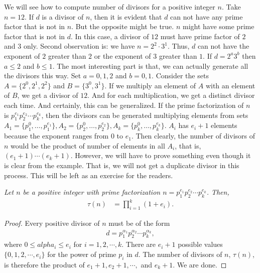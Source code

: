 \documentclass[12pt]{subfile}
\begin{document}
		We will see how to compute number of divisors for a positive integer $n$. Take $n=12$. If $d$ is a divisor of $n$, then it is evident that $d$ can not have any prime factor that is not in $n$. But the opposite might be true. $n$ might have some prime factor that is not in $d$. In this case, a divisor of $12$ must have prime factor of $2$ and $3$ only. Second observation is: we have $n=2^2\cdot3^1$. Thus, $d$ can not have the exponent of $2$ greater than $2$ or the exponent of $3$ greater than $1$. If $d=2^a3^b$ then $a\leq2$ and $b\leq1$. The most interesting part is that, we can actually generate all the divisors this way. Set $a=0,1,2$ and $b=0,1$. Consider the sets $A=\{2^0,2^1,2^2\}$ and $B=\{3^0,3^1\}$. If we multiply an element of $A$ with an element of $B$, we get a divisor of $12$. And for each multiplication, we get a distinct divisor each time. And certainly, this can be generalized. If the prime factorization of $n$ is $p_1^{e_1}p_2^{e_2}\cdots p_k^{e_k}$, then the divisors can be generated multiplying elements from sets $A_1=\{p_1^0,\ldots,p_1^{e_1}\},A_2=\{p_2^{0},\ldots,p_2^{e_2}\},A_k=\{p_k^0,\ldots,p_k^{e_k} \}$. $A_i$ has $e_i+1$ elements because the exponent ranges from $0$ to $e_1$. Then clearly, the number of divisors of $n$ would be the product of number of elements in all $A_i$, that is, $(e_1+1)\cdots(e_k+1)$. However, we will have to prove something even though it is clear from the example. That is, we will not get a duplicate divisor in this process. This will be left as an exercise for the readers.
			\begin{theorem}\slshape
				Let $n$ be a positive integer with prime factorization $n=p_1^{e_1}p_2^{e_2}\cdots p_k^{e_k}$. Then,
				\begin{align}
				\tau(n) &= \prod_{i=1}^{k} (1+e_i). \label{eq:dformula-eq1}
				\end{align}
			\end{theorem}
			
			\begin{proof}
				Every positive divisor of $n$ must be of the form
				\begin{align*}
				d = p_1^{\alpha_1} p_2^{\alpha_2} \cdots p_k^{\alpha_k},
				\end{align*}
				where $0 \leq alpha_i \leq e_i$ for $i=1,2,\cdots,k$. There are $e_i+1$ possible values $\{0, 1, 2, \cdots, e_i\}$ for the power of prime $p_i$ in $d$. The number of divisors of $n$, $\tau(n)$, is therefore the product of $e_1+1, e_2+1, \cdots ,$ and $e_k+1$. We are done.
			\end{proof}
		
\end{document}
